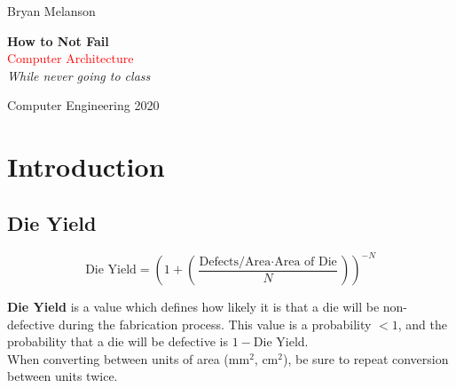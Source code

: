 \documentclass[11pt]{article}
\newcommand*{\plogo}{\fbox{$\mathcal{BM}$}}
\begin{document}
 
        
    \begin{titlepage}
    
        \raggedleft
        
        \vspace*{\baselineskip}
        
        {\Large Bryan Melanson}
        
        \vspace*{0.167\textheight}
        
        \textbf{\LARGE How to Not Fail}\\[\baselineskip]
        
        {\textcolor{Red}{\Huge Computer Architecture}}\\[\baselineskip]
        
        {\Large \textit{While never going to class}}
        
        \vfill
        
        {\large Computer Engineering 2020 ~~\plogo}
        
        \vspace*{3\baselineskip}
    
    \end{titlepage}

    \pagebreak
    
    
    \tableofcontents


\section{Introduction}

\subsection{Die Yield}

        
\begin{center}
    \begin{equation}
    \text{Die Yield} = (1 + (\frac{\text{Defects/Area} \cdot \text{Area of Die}}{N}))^{-N}
    \end{equation}
\end{center}

\textbf{Die Yield} is a value which defines how likely it is that a die will be non-defective during the fabrication process. This value is a probability $< 1$, and the probability that a die will be defective is $1 - $Die Yield. \\
When converting between units of area (mm$^2$, cm$^2$), be sure to repeat conversion between units twice.
\end{document}
